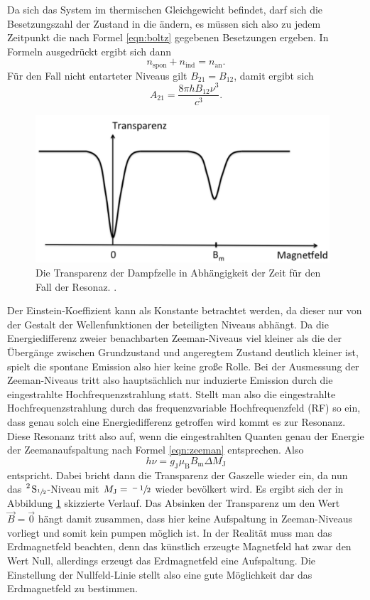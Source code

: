 Da sich das System im thermischen Gleichgewicht befindet, darf sich die Besetzungszahl der Zustand in die ändern,
es müssen sich also zu jedem Zeitpunkt die nach Formel \eqref{eqn:boltz} gegebenen Besetzungen ergeben. In Formeln ausgedrückt
ergibt sich dann
\begin{equation*}
  n_\text{spon} + n_\text{ind} = n_\text{an}.
\end{equation*}
Für den Fall nicht entarteter Niveaus gilt $B_{21} = B_{12}$, damit ergibt sich
\begin{equation}
  \label{eqn:a}
  A_{21} = \frac{8 \pi h B_{12} \nu^3}{c^3}.
\end{equation}
\begin{figure}
  \centering
  \includegraphics[height=5.5cm]{content/pictures/Resonanz.png}
  \caption{Die Transparenz der Dampfzelle in Abhängigkeit der Zeit für den Fall der Resonaz. \cite{anleitung}.}
  \label{fig:resonanz}
\end{figure}
Der Einstein-Koeffizient kann als Konstante betrachtet werden, da dieser nur von der Gestalt der 
Wellenfunktionen der beteiligten Niveaus abhängt. Da die Energiedifferenz zweier benachbarten Zeeman-Niveaus viel kleiner als
die der Übergänge zwischen Grundzustand und angeregtem Zustand deutlich kleiner ist, spielt die
spontane Emission also hier keine große Rolle. Bei der Ausmessung der Zeeman-Niveaus tritt also hauptsächlich
nur induzierte Emission durch die eingestrahlte Hochfrequenzstrahlung statt.
Stellt man also die eingestrahlte Hochfrequenzstrahlung durch das frequenzvariable Hochfrequenzfeld (RF) so ein,
dass genau solch eine Energiedifferenz getroffen wird kommt es zur Resonanz.
Diese Resonanz tritt also auf, wenn die eingestrahlten Quanten genau der Energie der Zeemanaufspaltung nach Formel \eqref{eqn:zeeman} entsprechen.
Also 
\begin{equation*}
  h \nu = g_\text{J} \mu_\text{B} B_\text{m} \Delta M_\text{J}
\end{equation*}
entspricht. Dabei bricht dann die Transparenz der Gaszelle wieder ein, da nun das $\ce{^2 S_{\sfrac{1}{2}}}$-Niveau mit $M_\text{J}=\sfrac{-1}{2}$ wieder 
bevölkert wird. Es ergibt sich der in Abbildung \ref{fig:resonanz} skizzierte Verlauf.
Das Absinken der Transparenz um den Wert $\vec{B}=\vec{0}$ hängt damit zusammen, dass hier keine Aufspaltung in Zeeman-Niveaus vorliegt
und somit kein pumpen möglich ist. In der Realität muss man das Erdmagnetfeld beachten, denn das 
künstlich erzeugte Magnetfeld hat zwar den Wert Null, allerdings erzeugt das Erdmagnetfeld eine Aufspaltung. Die Einstellung der Nullfeld-Linie
stellt also eine gute Möglichkeit dar das Erdmagnetfeld zu bestimmen.


